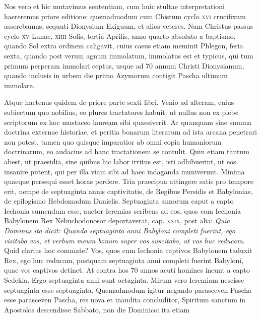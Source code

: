 Nos vero et
hic mutavimus sententiam, cum huic stultae interpretationi haereremus
priore editione: quemadmodum cum Chistum cyclo \textsc{xvi} crucifixum
asserebamus, sequuti Dionysium Exiguum, et alios veteres.
{}
Nam Christus passus cyclo \textsc{xv} Lunae, \textsc{xiiii} Solis,
 tertia Aprilis,
anno quarto absoluto a baptismo, quando Sol extra ordinem caligavit,
cuius casus etiam meminit Phlegon, feria sexta, quando
post verum agnum immolatum, immolatus est et typicus, qui tum
primum perperam immolari ceptus, usque ad 70 annum Christi
Dionysianum, quando inclusis in urbem die primo Azymorum
contigit Pascha ultimum immolare.

Atque hactenus quidem de
priore parte sexti libri.
Venio ad alteram, cuius subiectum quo nobilius,
eo plures tractatores habuit: ut nullus non ex plebe scriptorum
ex hoc mustaceo lauream sibi quaesiverit.
Ac quanquam sine
summa doctrina externae historiae, et peritia bonarum literarum
ad ista arcana penetrari non potest, tamen quo quisque imparatior
ab omni copia humaniorum doctrinarum, eo audacius ad hanc
tractationem se contulit.
Quin etiam tantum abest, ut praesidia,
sine quibus hic labor irritus est, isti adhibuerint, ut eos insanire
putent, qui per illa viam sibi ad haec indaganda muniverunt.
Minima quaeque persequi esset horas perdere.
Tria praecipua attingere
satis pro tempore erit, nempe de septuaginta annis captivitatis,
de Regibus Persidis et Babyloniae, de epilogismo Hebdomadum
Danielis.
Septuaginta annorum caput a capto Iechonia sumendum
esse, auctor Ieremias scribens ad eos, quos com Iechonia Babylonem
Rex Nebuchodonosor deportaverat, cap. \textsc{xxix}, post
alia: \textit{Quia Dominus ita dicit: Quando septuaginta anni Babyloni completi
fuerint, ego visitabo vos, et verbum meum bonum super vos
suscitabo, ut vos huc reducam}.
Quid clarius hoc commate?
Vos,
quos cum Iechonia captivos Babylonem taduxit Rex, ego huc
reducam, postquam septuaginta anni completi fuerint Babyloni,
quae vos captivos detinet.
At contra hos 70 annos acuti homines
ineunt a capto Sedekia.
Ergo septuaginta anni sunt octaginta.
Mirum vero Ieremiam nescisse septuaginta esse septuaginta.
Quemadmodum
igitur negando parasceven Pascha esse parasceven
Pascha, res nova et inaudita concluditor, Spiritum sanctum in 
Apostolos descendisse Sabbato, non die Dominico: ita etiam
